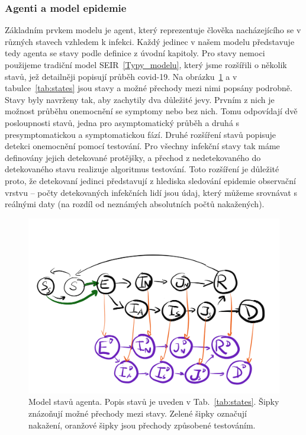 \subsubsection*{Agenti a model epidemie}

Základním prvkem modelu je agent, který reprezentuje člověka nacházejícího se v různých stavech vzhledem k infekci. Každý jedinec v našem modelu představuje tedy agenta se stavy podle definice z úvodní kapitoly. Pro stavy nemoci použijeme tradiční model SEIR~\ref{Typy_modelu}, který jsme rozšířili o několik stavů, jež detailněji popisují průběh covid-19. Na obrázku~\ref{fig:model-states} a v tabulce~\ref{tab:states} jsou stavy a možné přechody mezi nimi popsány podrobně. Stavy byly navrženy tak, aby zachytily dva důležité jevy. Prvním z nich je možnost průběhu onemocnění se symptomy nebo bez nich. Tomu odpovídají dvě posloupnosti stavů, jedna pro asymptomatický průběh a druhá s presymptomatickou a symptomatickou fází. Druhé rozšíření stavů popisuje detekci onemocnění pomocí testování. Pro všechny infekční stavy tak máme definovány jejich detekované protějšky, a přechod z nedetekovaného do detekovaného stavu realizuje algoritmus testování. Toto rozšíření je důležité proto, že detekovaní jedinci představují z hlediska sledování epidemie observační vrstvu -- počty detekovaných infekčních lidí jsou údaj, který můžeme srovnávat s reálnými daty (na rozdíl od neznámých absolutních počtů nakažených).

    

\begin{figure}%
\centerline{%
\includegraphics[width=0.99\columnwidth]{pic/epi08}%
}
\caption{Model stavů agenta. Popis stavů je uveden v Tab.~\ref{tab:states}. Šipky znázoňují možné přechody mezi stavy. Zelené šipky označují nakažení, oranžové šipky jsou přechody způsobené testováním.}%
\label{fig:model-states}%
\end{figure}



